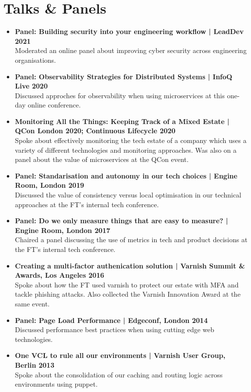\documentclass[a4paper]{article}
\begin{document}
\section*{Talks \& Panels}
\begin{itemize}

\item{\bf Panel: Building security into your engineering workflow | LeadDev 2021}\\
Moderated an online panel about improving cyber security across engineering organisations.
\item{\bf Panel: Observability Strategies for Distributed Systems | InfoQ Live 2020}\\
Discussed approches for observability when using microservices at this one-day online conference.
\item{\bf Monitoring All the Things: Keeping Track of a Mixed Estate | QCon London 2020; Continuous Lifecycle 2020}\\
Spoke about effectively monitoring the tech estate of a company which uses a variety of different technologies and monitoring approaches.  Was also on a panel about the value of microservices at the QCon event.
\item{\bf Panel: Standarisation and autonomy in our tech choices | Engine Room, London 2019}\\
Discussed the value of consistency versus local optimisation in our technical approaches at the FT's internal tech conference.
\item{\bf Panel: Do we only measure things that are easy to measure? | Engine Room, London 2017}\\
Chaired a panel discussing the use of metrics in tech and product decisions at the FT's internal tech conference.
\item{\bf Creating a multi-factor authenication solution | Varnish Summit \& Awards, Los Angeles 2016}\\
Spoke about how the FT used varnish to protect our estate with MFA and tackle phishing attacks.  Also collected the Varnish Innovation Award at the same event.
\item{\bf Panel: Page Load Performance | Edgeconf, London 2014 }\\
Discussed performance best practices when using cutting edge web technologies.
\item{\bf One VCL to rule all our environments | Varnish User Group, Berlin 2013}\\
Spoke about the consolidation of our caching and routing logic across environments using puppet.
\end{itemize}
\end{document}
